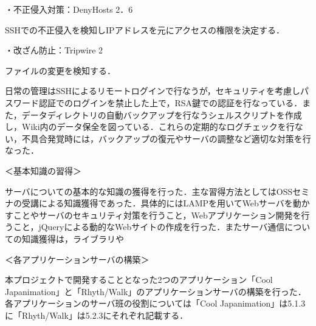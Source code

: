 \par
\par ・不正侵入対策：DenyHosts 2．6
\par SSHでの不正侵入を検知しIPアドレスを元にアクセスの権限を決定する．
\par
\par ・改ざん防止：Tripwire 2
\par ファイルの変更を検知する．
\par 
\par
日常の管理はSSHによるリモートログインで行なうが，セキュリティを考慮しパスワード認証でのログインを禁止した上で，RSA鍵での認証を行なっている．また，データディレクトリの自動バックアップを行なうシェルスクリプトを作成し，Wiki内のデータ保全を図っている．これらの定期的なログチェックを行ない，不具合発覚時には，バックアップの復元やサーバの調整など適切な対策を行なった．
\par 
\par ＜基本知識の習得＞
\par
サーバについての基本的な知識の獲得を行った．主な習得方法としてはOSSセミナの受講による知識獲得であった．具体的にはLAMPを用いてWebサーバを動かすことやサーバのセキュリティ対策を行うこと，Webアプリケーション開発を行うこと，jQueryによる動的なWebサイトの作成を行った．またサーバ通信についての知識獲得は，ライブラリや
\par ＜各アプリケーションサーバの構築＞
\par
本プロジェクトで開発することとなった2つのアプリケーション「Cool Japanimation」と「Rhyth/Walk」のアプリケーションサーバの構築を行った．各アプリケーションのサーバ班の役割については「Cool Japanimation」は5.1.3に「Rhyth/Walk」は5.2.3にそれぞれ記載する．

